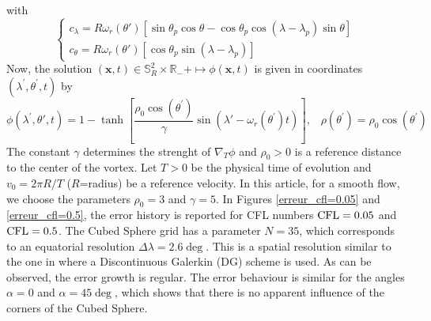 \eeq
with
\begin{equation}
\left\{
\begin{array}{l}
c_{\lambda} = R \omega_r ( \theta' ) \left[ \sin \theta_p \cos \theta - \cos \theta_p \cos ( \lambda - \lambda_p ) \sin \theta \right]\\
c_{\theta} = R \omega_r ( \theta' ) 
\left[ \cos \theta_p \sin ( \lambda - \lambda_p ) \right]
\label{eq:78.10}
\end{array}
\right.
\end{equation}
Now, the solution $(\mathbf{x}, t) \in \mathbb{S}_R^2 \times \mathbb{R}_{-}+ \mapsto
\phi(\mathbf{x},t)$ is given in coordinates $(\lambda^\prime,\theta^\prime,t)$ by
\begin{equation}
\phi ( \lambda^\prime , \theta', t ) 
= 
1 - \tanh \left[ \dfrac{\rho_0\cos(\theta^\prime)}{\gamma} \sin ( \lambda' 
- \omega_r(\theta^\prime) t ) \right],\;\;\; \rho(\theta^\prime)= 
\rho_0 \cos(\theta^\prime)
\label{NM_exacte}
\end{equation}
The constant $\gamma$
determines the strenght of $\nabla_T\phi$ and $\rho_0>0$ 
is a reference distance to the center of the vortex.
Let $T>0$ be the physical time of evolution and $v_0 = 2 \pi R / T$ ($R$=radius)
be a reference velocity. 
In this article, for a smooth flow, we choose the parameters $\rho_0 = 3$ and $ \gamma = 5$.
In Figures \ref{erreur_cfl=0.05} and \ref{erreur_cfl=0.5}, the error history
is reported for CFL numbers $\mathop{\rm CFL}\nolimits=0.05$ and $\mathop{\rm CFL}\nolimits=0.5$.
The Cubed Sphere grid has a parameter $N=35$, which corresponds 
to an equatorial resolution $\Delta \lambda = 2.6 \deg$. 
This is a spatial resolution similar to the one 
in \cite{Nair-Jablonowski}
where a Discontinuous Galerkin (DG) scheme is used.
As can be observed, the error growth is regular.
The error behaviour is similar for the angles 
$\alpha=0$ and $\alpha=45\deg$, which shows 
that there is no apparent influence
of the corners of the Cubed Sphere.

